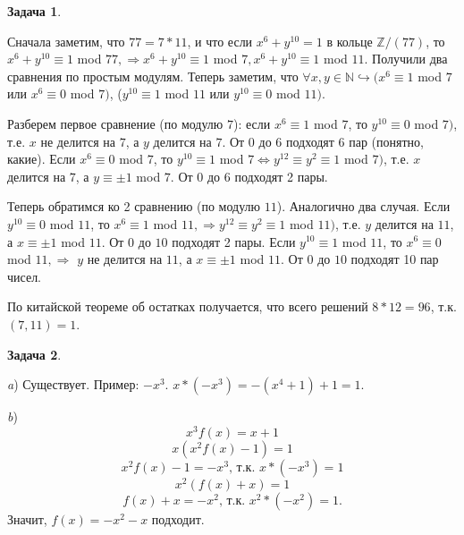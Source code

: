 \documentclass[12pt]{article}
\theoremstyle{definition}
\newtheorem{task}{Задача}
\def\NN{\mathbb N}
\def\ZZ{\mathbb Z}
\begin{document}
\begin{task} 
\textit{}

\textit{} Сначала заметим, что $77=7*11$, и что если $x^6+y^10=1$ в кольце $\ZZ/(77)$, то $x^6+y^10\equiv 1$ mod $77, \Rightarrow x^6+y^10\equiv 1$ mod $7, x^6+y^10\equiv 1$ mod $11$. Получили два сравнения по простым модулям. Теперь заметим, что $\forall x, y\in \NN \hookrightarrow (x^6\equiv 1$ mod $7$ или $x^6\equiv 0$ mod $7)$, ($y^10\equiv 1$ mod $11$ или $y^10\equiv 0$ mod $11)$. 

\textit{} Разберем первое сравнение (по модулю $7$): если $x^6\equiv 1$ mod $7$, то $y^10\equiv 0$ mod $7)$, т.е. $x$ не делится на $7$, а $y$ делится на $7$. От $0$ до $6$ подходят 6 пар (понятно, какие). Если $x^6\equiv 0$ mod $7$, то $y^10\equiv 1$ mod $7 \Leftrightarrow y^12\equiv y^2\equiv 1$ mod $7)$, т.е. $x$ делится на $7$, а $y\equiv \pm 1$ mod $7$. От $0$ до $6$ подходят 2 пары.

\textit{} Теперь обратимся ко 2 сравнению (по модулю $11$). Аналогично два случая. Если $y^10\equiv 0$ mod $11$, то $x^6\equiv 1$ mod $11, \Rightarrow y^12\equiv y^2\equiv 1$ mod $11)$, т.е. $y$ делится на $11$, а $x\equiv \pm 1$ mod $11$. От $0$ до $10$ подходят 2 пары. Если $y^10\equiv 1$ mod $11$, то $x^6\equiv 0$ mod $11, \Rightarrow$ $y$ не делится на $11$, а $x\equiv \pm 1$ mod $11$. От $0$ до $10$ подходят 10 пар чисел.

\textit{} По китайской теореме об остатках получается, что всего решений $8*12=96$, т.к. $(7, 11) = 1$.

\end{task}








\begin{task} 
\textit{}

\textit{a}) Существует. Пример: $-x^3$. $x*(-x^3)=-(x^4+1)+1=1$.

\textit{b}) $$x^3 f(x)=x+1$$ $$x(x^2f(x)-1)=1$$ $$x^2f(x)-1=-x^3\text{, т.к. } x*(-x^3)=1$$ $$x^2(f(x)+x)=1$$ $$f(x)+x=-x^2\text{, т.к. } x^2*(-x^2)=1.$$ Значит, $f(x)=-x^2-x$ подходит.

\end{task}
\end{document}
